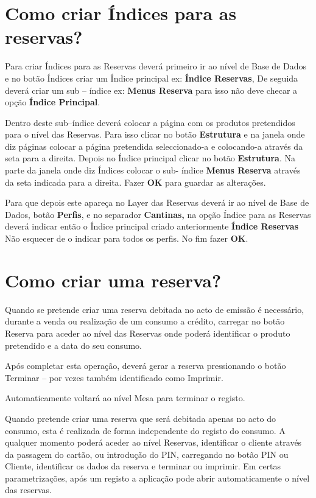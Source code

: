 \documentclass[a4paper,11pt,openany]{memoir}
\begin{document}
\section{Como criar Índices para as reservas?}
Para criar Índices para as Reservas deverá primeiro ir ao nível de Base de Dados e
no botão Índices criar um Índice principal ex: \textbf{Índice Reservas}, De seguida deverá
criar um sub – índice ex: \textbf{Menus Reserva} para isso não deve checar a opção \textbf{Índice Principal}. 

Dentro deste sub–índice deverá colocar a página com os produtos
pretendidos para o nível das Reservas. Para isso clicar no botão \textbf{Estrutura} e na
janela onde diz páginas colocar a página pretendida seleccionado-a e colocando-a
através da seta para a direita. 
Depois no Índice principal clicar no botão \textbf{Estrutura}.
Na parte da janela onde diz Índices colocar o sub- índice \textbf{Menus Reserva} através
da seta indicada para a direita. Fazer \textbf{OK} para guardar as alterações.

Para que depois este apareça no Layer das Reservas deverá ir ao nível de Base de
Dados, botão \textbf{Perfis}, e no separador \textbf{Cantinas,} na opção Índice para as Reservas
deverá indicar então o Índice principal criado anteriormente \textbf{Índice Reservas}
Não esquecer de o indicar para todos os perfis. No fim fazer \textbf{OK}.


\section{Como criar uma reserva?}
Quando se pretende criar uma reserva debitada no acto de emissão é necessário,
durante a venda ou realização de um consumo a crédito, carregar no botão Reserva
para aceder ao nível das Reservas onde poderá identificar o produto pretendido e a
data do seu consumo. 

Após completar esta operação, deverá gerar a reserva
pressionando o botão Terminar – por vezes também identificado como Imprimir.

Automaticamente voltará ao nível Mesa para terminar o registo.

Quando pretende criar uma reserva que será debitada apenas no acto do consumo,
esta é realizada de forma independente do registo do consumo. A qualquer
momento poderá aceder ao nível Reservas, identificar o cliente através da
passagem do cartão, ou introdução do PIN, carregando no botão PIN ou Cliente,
identificar os dados da reserva e terminar ou imprimir.
Em certas parametrizações, após um registo a aplicação pode abrir
automaticamente o nível das reservas.
\end{document}
